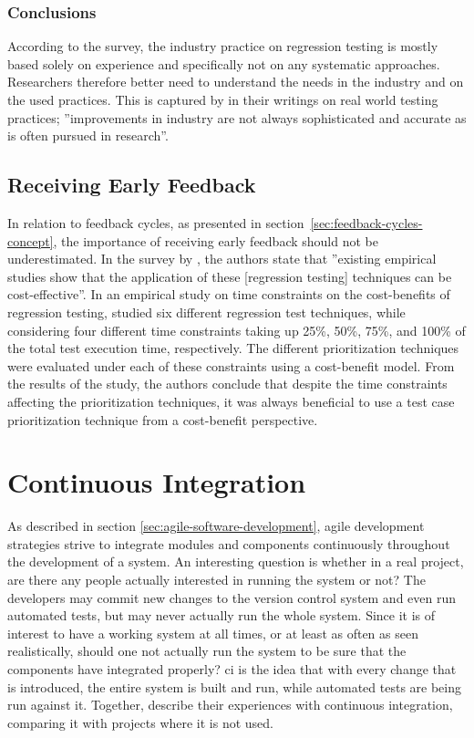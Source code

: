 \documentclass[a4paper,english,12pt]{report}
\begin{document}
\subsubsection{Conclusions}
According to the survey, the industry practice on regression testing is mostly based solely on experience and specifically not on any systematic approaches. Researchers therefore better need to understand the needs in the industry and on the used practices. This is captured by \citet{rooksby2009testing} in their writings on real world testing practices; ''improvements in industry are not always sophisticated and accurate as is often pursued in research''. \citep[p. 251]{runeson2012regression}

\subsection{Receiving Early Feedback}\label{sec:receiving-early-feedback}
In relation to feedback cycles, as presented in section~\vref{sec:feedback-cycles-concept}, the importance of receiving early feedback should not be underestimated. In the survey by \citet{yoo2012regression}, the authors state that ''existing empirical studies show that the application of these [regression testing] techniques can be cost-effective''. In an empirical study on time constraints on the cost-benefits of regression testing, \citet{do2008empirical} studied six different regression test techniques, while considering four different time constraints taking up 25\%, 50\%, 75\%, and 100\% of the total test execution time, respectively. The different prioritization techniques were evaluated under each of these constraints using a cost-benefit model. From the results of the study, the authors conclude that despite the time constraints affecting the prioritization techniques, it was always beneficial to use a test case prioritization technique from a cost-benefit perspective. \citep[p. 93]{yoo2012regression}

\section{Continuous Integration}
As described in section \vref{sec:agile-software-development}, agile development strategies strive to integrate modules and components continuously throughout the development of a system. An interesting question is whether in a real project, are there any people actually interested in running the system or not? The developers may commit new changes to the version control system and even run automated tests, but may never actually run the whole system. Since it is of interest to have a working system at all times, or at least as often as seen realistically, should one not actually run the system to be sure that the components have integrated properly? \Gls{ci} is the idea that with every change that is introduced, the entire system is built and run, while automated tests are being run against it. \citep[p. 55]{humble2010continuous} Together, \citet{humble2010continuous} describe their experiences with continuous integration, comparing it with projects where it is not used.
\end{document}
